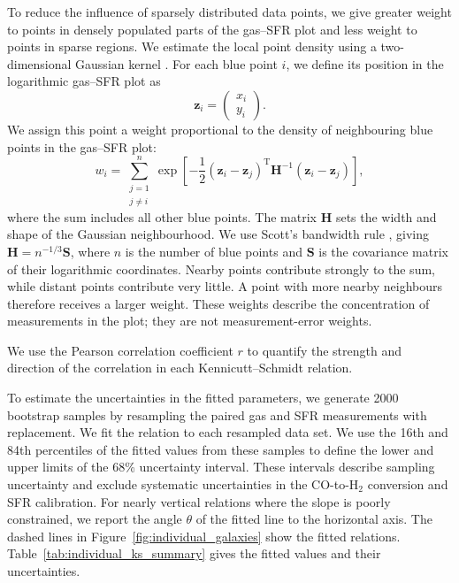 To reduce the influence of sparsely distributed data points, we give greater weight to points in densely populated parts of the gas--SFR plot and less weight to points in sparse regions. We estimate the local point density using a two-dimensional Gaussian kernel \citep{Scott1992}. For each blue point $i$, we define its position in the logarithmic gas--SFR plot as
\begin{equation}
\mathbf{z}_i =
\begin{pmatrix}
x_i \\
y_i
\end{pmatrix}.
\end{equation}
We assign this point a weight proportional to the density of neighbouring blue points in the gas--SFR plot:
\begin{equation}
\label{eq:ks_density_weight}
w_i = \sum_{\substack{j=1\\j\ne i}}^{n}
\exp\!\left[-\frac{1}{2}
(\mathbf{z}_i-\mathbf{z}_j)^{\mathrm{T}}
\mathbf{H}^{-1}
(\mathbf{z}_i-\mathbf{z}_j)\right],
\end{equation}
where the sum includes all other blue points. The matrix $\mathbf{H}$ sets the width and shape of the Gaussian neighbourhood. We use Scott's bandwidth rule \citep{Scott1992}, giving $\mathbf{H}=n^{-1/3}\mathbf{S}$, where $n$ is the number of blue points and $\mathbf{S}$ is the covariance matrix of their logarithmic coordinates. Nearby points contribute strongly to the sum, while distant points contribute very little. A point with more nearby neighbours therefore receives a larger weight. These weights describe the concentration of measurements in the plot; they are not measurement-error weights.

We use the Pearson correlation coefficient $r$ to quantify the strength and direction of the correlation in each Kennicutt--Schmidt relation.

To estimate the uncertainties in the fitted parameters, we generate 2000 bootstrap samples by resampling the paired gas and SFR measurements with replacement. We fit the relation to each resampled data set. We use the 16th and 84th percentiles of the fitted values from these samples to define the lower and upper limits of the 68\% uncertainty interval. These intervals describe sampling uncertainty and exclude systematic uncertainties in the CO-to-H$_2$ conversion and SFR calibration. For nearly vertical relations where the slope is poorly constrained, we report the angle $\theta$ of the fitted line to the horizontal axis. The dashed lines in Figure~\ref{fig:individual_galaxies} show the fitted relations. Table~\ref{tab:individual_ks_summary} gives the fitted values and their uncertainties.
